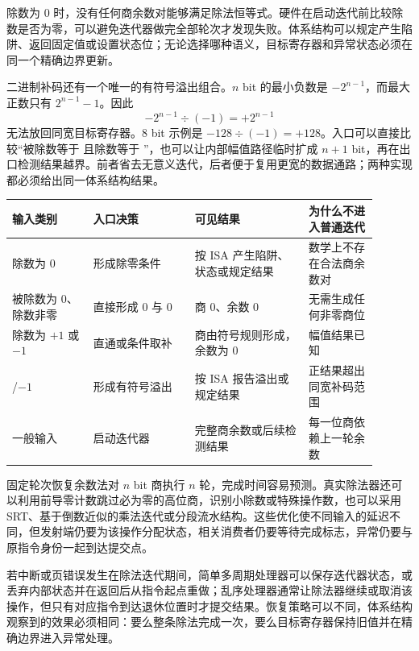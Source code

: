 
除数为 0 时，没有任何商余数对能够满足除法恒等式。硬件在启动迭代前比较除数是否为零，可以避免迭代器做完全部轮次才发现失败。体系结构可以规定产生陷阱、返回固定值或设置状态位；无论选择哪种语义，目标寄存器和异常状态必须在同一个精确边界更新。

二进制补码还有一个唯一的有符号溢出组合。$n$ bit 的最小负数是 $-2^{n-1}$，而最大正数只有 $2^{n-1}-1$。因此
\[
    -2^{n-1}\div(-1)=+2^{n-1}
\]
无法放回同宽目标寄存器。8 bit 示例是 $-128\div(-1)=+128$。入口可以直接比较“被除数等于  且除数等于 ”，也可以让内部幅值路径临时扩成 $n+1$ bit，再在出口检测结果越界。前者省去无意义迭代，后者便于复用更宽的数据通路；两种实现都必须给出同一体系结构结果。

\begin{longtable}{L{0.20\linewidth}L{0.25\linewidth}L{0.28\linewidth}L{0.17\linewidth}}
\toprule
输入类别 & 入口决策 & 可见结果 & 为什么不进入普通迭代 \\
\midrule
除数为 0 & 形成除零条件 & 按 ISA 产生陷阱、状态或规定结果 & 数学上不存在合法商余数对 \\\tablerowrule
被除数为 0、除数非零 & 直接形成 0 与 0 & 商 0、余数 0 & 无需生成任何非零商位 \\\tablerowrule
除数为 $+1$ 或 $-1$ & 直通或条件取补 & 商由符号规则形成，余数为 0 & 幅值结果已知 \\\tablerowrule
{}/$-1$ & 形成有符号溢出 & 按 ISA 报告溢出或规定结果 & 正结果超出同宽补码范围 \\\tablerowrule
一般输入 & 启动迭代器 & 完整商余数或后续检测结果 & 每一位商依赖上一轮余数 \\
\bottomrule
\end{longtable}


固定轮次恢复余数法对 $n$ bit 商执行 $n$ 轮，完成时间容易预测。真实除法器还可以利用前导零计数跳过必为零的高位商，识别小除数或特殊操作数，也可以采用 SRT、基于倒数近似的乘法迭代或分段流水结构。这些优化使不同输入的延迟不同，但发射端仍要为该操作分配状态，相关消费者仍要等待完成标志，异常仍要与原指令身份一起到达提交点。

若中断或页错误发生在除法迭代期间，简单多周期处理器可以保存迭代器状态，或丢弃内部状态并在返回后从指令起点重做；乱序处理器通常让除法器继续或取消该操作，但只有对应指令到达退休位置时才提交结果。恢复策略可以不同，体系结构观察到的效果必须相同：要么整条除法完成一次，要么目标寄存器保持旧值并在精确边界进入异常处理。
